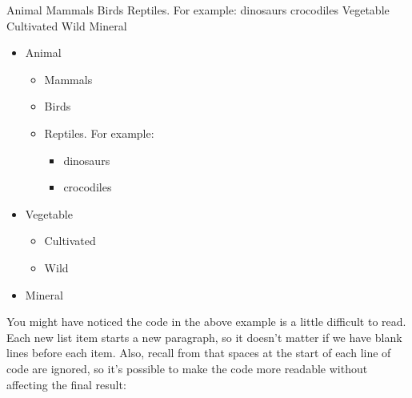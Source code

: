 \begin{code}
\newline
{} Animal\newline
{}\newline
{} Mammals\newline
{} Birds\newline
{} Reptiles. For example:\newline
{}\newline
{} dinosaurs\newline
{} crocodiles\newline
{}\newline
{}\newline
{} Vegetable\newline
{}\newline
{} Cultivated\newline
{} Wild\newline
{}\newline
{} Mineral\newline
{}
\end{code}
\begin{result}
\begin{itemize}
\item Animal
\begin{itemize}
\item Mammals
\item Birds
\item Reptiles. For example:
\begin{itemize}
\item dinosaurs
\item crocodiles
\end{itemize}
\end{itemize}
\item Vegetable
\begin{itemize}
\item Cultivated
\item Wild
\end{itemize}
\item Mineral
\end{itemize}
\end{result}

You might have noticed the code in the above example is a little
difficult to read. Each new list item starts a new paragraph, so it
doesn't matter if we have blank lines before each item. Also, recall
from  that spaces at the start of each line of
code are ignored, so it's possible to make the code more readable
without affecting the final result:

